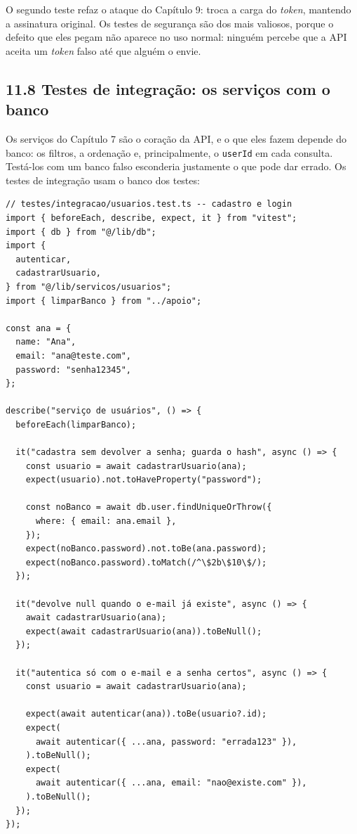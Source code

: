 O segundo teste refaz o ataque do Capítulo 9: troca a carga do \textit{token}, mantendo a assinatura original. Os testes de segurança são dos mais valiosos, porque o defeito que eles pegam não aparece no uso normal: ninguém percebe que a API aceita um \textit{token} falso até que alguém o envie.

\subsection{11.8 Testes de integração: os serviços com o banco}

Os serviços do Capítulo 7 são o coração da API, e o que eles fazem depende do banco: os filtros, a ordenação e, principalmente, o \texttt{userId} em cada consulta. Testá-los com um banco falso esconderia justamente o que pode dar errado. Os testes de integração usam o banco dos testes:

\begin{codigo}
\begin{Verbatim}[breaklines=true, breaksymbolleft={}, fontsize=\footnotesize]
// testes/integracao/usuarios.test.ts -- cadastro e login
import { beforeEach, describe, expect, it } from "vitest";
import { db } from "@/lib/db";
import {
  autenticar,
  cadastrarUsuario,
} from "@/lib/servicos/usuarios";
import { limparBanco } from "../apoio";

const ana = {
  name: "Ana",
  email: "ana@teste.com",
  password: "senha12345",
};

describe("serviço de usuários", () => {
  beforeEach(limparBanco);

  it("cadastra sem devolver a senha; guarda o hash", async () => {
    const usuario = await cadastrarUsuario(ana);
    expect(usuario).not.toHaveProperty("password");

    const noBanco = await db.user.findUniqueOrThrow({
      where: { email: ana.email },
    });
    expect(noBanco.password).not.toBe(ana.password);
    expect(noBanco.password).toMatch(/^\$2b\$10\$/);
  });

  it("devolve null quando o e-mail já existe", async () => {
    await cadastrarUsuario(ana);
    expect(await cadastrarUsuario(ana)).toBeNull();
  });

  it("autentica só com o e-mail e a senha certos", async () => {
    const usuario = await cadastrarUsuario(ana);

    expect(await autenticar(ana)).toBe(usuario?.id);
    expect(
      await autenticar({ ...ana, password: "errada123" }),
    ).toBeNull();
    expect(
      await autenticar({ ...ana, email: "nao@existe.com" }),
    ).toBeNull();
  });
});
\end{Verbatim}
\end{codigo}


